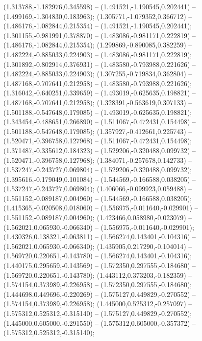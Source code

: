  (1.313788,-1.182976,0.345598) -- (1.491521,-1.190545,0.202441) -- (1.499169,-1.304830,0.183963);
 (1.305771,-1.079352,0.366712) -- (1.486176,-1.082844,0.215354) -- (1.491521,-1.190545,0.202441);
 (1.301155,-0.981991,0.378870) -- (1.483086,-0.981171,0.222819) -- (1.486176,-1.082844,0.215354);
 (1.299869,-0.890085,0.382259) -- (1.482224,-0.885033,0.224903) -- (1.483086,-0.981171,0.222819);
 (1.301892,-0.802914,0.376931) -- (1.483580,-0.793988,0.221626) -- (1.482224,-0.885033,0.224903);
 (1.307255,-0.719834,0.362804) -- (1.487168,-0.707641,0.212958) -- (1.483580,-0.793988,0.221626);
 (1.316042,-0.640251,0.339659) -- (1.493019,-0.625635,0.198821) -- (1.487168,-0.707641,0.212958);
 (1.328391,-0.563619,0.307133) -- (1.501188,-0.547648,0.179085) -- (1.493019,-0.625635,0.198821);
 (1.343454,-0.488651,0.266890) -- (1.511067,-0.472431,0.154498) -- (1.501188,-0.547648,0.179085);
 (1.357927,-0.412661,0.225743) -- (1.520471,-0.396758,0.127968) -- (1.511067,-0.472431,0.154498);
 (1.371487,-0.335612,0.184323) -- (1.529206,-0.320488,0.099732) -- (1.520471,-0.396758,0.127968);
 (1.384071,-0.257678,0.142733) -- (1.537247,-0.243727,0.069804) -- (1.529206,-0.320488,0.099732);
 (1.395616,-0.179049,0.101084) -- (1.544569,-0.166588,0.038205) -- (1.537247,-0.243727,0.069804);
 (1.406066,-0.099923,0.059488) -- (1.551152,-0.089187,0.004960) -- (1.544569,-0.166588,0.038205);
 (1.415365,-0.020508,0.018060) -- (1.556975,-0.011640,-0.029901) -- (1.551152,-0.089187,0.004960);
 (1.423466,0.058980,-0.023079) -- (1.562021,0.065930,-0.066340) -- (1.556975,-0.011640,-0.029901);
 (1.430326,0.138321,-0.063811) -- (1.566274,0.143401,-0.104316) -- (1.562021,0.065930,-0.066340);
 (1.435905,0.217290,-0.104014) -- (1.569720,0.220651,-0.143780) -- (1.566274,0.143401,-0.104316);
 (1.440175,0.295659,-0.143569) -- (1.572350,0.297555,-0.184680) -- (1.569720,0.220651,-0.143780);
 (1.443112,0.373203,-0.182359) -- (1.574154,0.373989,-0.226958) -- (1.572350,0.297555,-0.184680);
 (1.444698,0.449696,-0.220269) -- (1.575127,0.449829,-0.270552) -- (1.574154,0.373989,-0.226958);
 (1.445000,0.525312,-0.257097) -- (1.575312,0.525312,-0.315140) -- (1.575127,0.449829,-0.270552);
 (1.445000,0.605000,-0.291550) -- (1.575312,0.605000,-0.357372) -- (1.575312,0.525312,-0.315140);
